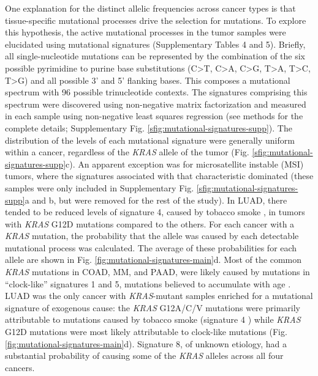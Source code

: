 \documentclass[english, 10pt, letterpaper]{article}
\newcommand{\KRAS}{\emph{KRAS}}
\begin{document}
One explanation for the distinct allelic frequencies across cancer types is that tissue-specific mutational processes drive the selection for mutations.
To explore this hypothesis, the active mutational processes in the tumor samples were elucidated using mutational signatures \cite{Alexandrov2013} (Supplementary Tables 4 and 5). 
Briefly, all single-nucleotide mutations can be represented by the combination of the six possible pyrimidine to purine base substitutions (C>T, C>A, C>G, T>A, T>C, T>G) and all possible 3’ and 5’ flanking bases. 
This composes a mutational spectrum with 96 possible trinucleotide contexts. 
The signatures comprising this spectrum were discovered using non-negative matrix factorization and measured in each sample using non-negative least squares regression (see methods for the complete details; Supplementary Fig. \ref{sfig:mutational-signatures-supp}).
The distribution of the levels of each mutational signature were generally uniform within a cancer, regardless of the \KRAS{} allele of the tumor (Fig. \ref{sfig:mutational-signatures-supp}c). 
An apparent exception was for microsatellite instable (MSI) tumors, where the signatures associated with that characteristic dominated (these samples were only included in Supplementary Fig. \ref{sfig:mutational-signatures-supp}a and b, but were removed for the rest of the study).
In LUAD, there tended to be reduced levels of signature 4, caused by tobacco smoke \cite{Alexandrov2016}, in tumors with \KRAS{} G12D mutations compared to the others.
For each cancer with a \KRAS{} mutation, the probability that the allele was caused by each detectable mutational process was calculated. 
The average of these probabilities for each allele are shown in Fig. \ref{fig:mutational-signatures-main}d. 
Most of the common \KRAS{} mutations in COAD, MM, and PAAD, were likely caused by mutations in “clock-like” signatures 1 and 5, mutations believed to accumulate with age \cite{Alexandrov2015}.
LUAD was the only cancer with \KRAS{}-mutant samples enriched for a mutational signature of exogenous cause: the \KRAS{} G12A/C/V mutations were primarily attributable to mutations caused by tobacco smoke (signature 4 \cite{Alexandrov2016}) while \KRAS{} G12D mutations were most likely attributable to clock-like mutations (Fig. \ref{fig:mutational-signatures-main}d).
Signature 8, of unknown etiology, had a substantial probability of causing some of the \KRAS{} alleles across all four cancers.
\end{document}
